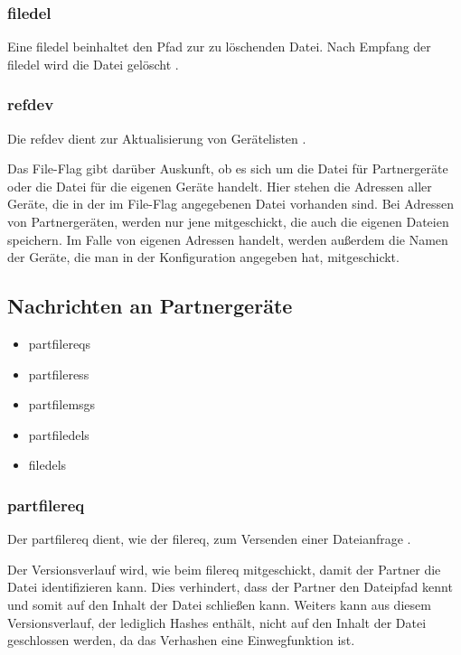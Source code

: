 \subsubsection{\gls{filedel}}
\sblitfiledelbytefield
Eine \gls{filedel} beinhaltet den Pfad zur zu löschenden Datei. Nach Empfang der \gls{filedel} wird die Datei gelöscht .

\subsubsection{\gls{refdev}}
\sblitrefdevbytefield
Die \gls{refdev} dient zur Aktualisierung von Gerätelisten .
\begin{description}
	Das File-Flag gibt darüber Auskunft, ob es sich um die Datei für Partnergeräte oder die Datei für die eigenen Geräte handelt.
	Hier stehen die Adressen aller Geräte, die in der im File-Flag angegebenen Datei vorhanden sind. Bei Adressen von Partnergeräten, werden nur jene mitgeschickt, die auch die eigenen Dateien speichern. Im Falle von eigenen Adressen handelt, werden außerdem die Namen der Geräte, die man in der Konfiguration angegeben hat, mitgeschickt.
\end{description}

\subsection{Nachrichten an Partnergeräte}
\begin{itemize}
	\item \gls{partfilereq}s
	\item \gls{partfileres}s
	\item \gls{partfilemsg}s
	\item \gls{partfiledel}s
	\item \gls{filedel}s
\end{itemize}

\subsubsection{\gls{partfilereq}} \label{partnerfilerequest}
\sblitpartfilereqbytefield
Der \gls{partfilereq} dient, wie der \gls{filereq}, zum Versenden einer Dateianfrage .
\begin{description}
	Der Versionsverlauf wird, wie beim \gls{filereq} mitgeschickt, damit der Partner die Datei identifizieren kann. Dies verhindert, dass der Partner den Dateipfad kennt und somit auf den Inhalt der Datei schließen kann. Weiters kann aus diesem Versionsverlauf, der lediglich Hashes enthält, nicht auf den Inhalt der Datei geschlossen werden, da das Verhashen eine Einwegfunktion ist. 
\end{description}

